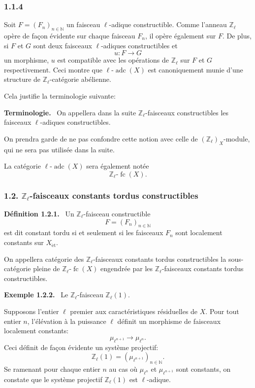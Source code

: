 \documentclass[11pt]{article}
\newenvironment{statement}[1]{\par\medskip\noindent\textbf{#1.}\ }{\par\medskip}
\providecommand{\fc}{\operatorname{fc}}
\providecommand{\adc}{\operatorname{adc}}
\begin{document}
\subsubsection*{1.1.4}
Soit \(F=(F_n)_{n\in\mathbb N}\) un faisceau \(\ell\)-adique constructible. Comme l'anneau \(\mathbb Z_\ell\) opère de façon évidente sur chaque faisceau \(F_n\), il opère également sur \(F\). De plus, si \(F\) et \(G\) sont deux faisceaux \(\ell\)-adiques constructibles et
\[
u:F\longrightarrow G
\]
un morphisme, \(u\) est compatible avec les opérations de \(\mathbb Z_\ell\) sur \(F\) et \(G\) respectivement. Ceci montre que \(\ell\text{-}\adc(X)\) est canoniquement munie d'une structure de \(\mathbb Z_\ell\)-catégorie abélienne.

Cela justifie la terminologie suivante:

\begin{statement}{Terminologie}
On appellera dans la suite \(\mathbb Z_\ell\)-faisceaux constructibles les faisceaux \(\ell\)-adiques constructibles.
\end{statement}

On prendra garde de ne pas confondre cette notion avec celle de \((\mathbb Z_\ell)_X\)-module, qui ne sera pas utilisée dans la suite.

La catégorie \(\ell\text{-}\adc(X)\) sera également notée
\[
\mathbb Z_\ell\text{-}\fc(X).
\]

\subsubsection*{1.2. \(\mathbb Z_\ell\)-faisceaux constants tordus constructibles}

\begin{statement}{Définition 1.2.1}
Un \(\mathbb Z_\ell\)-faisceau constructible
\[
F=(F_n)_{n\in\mathbb N}
\]
est dit constant tordu si et seulement si les faisceaux \(F_n\) sont localement constants sur \(X_{\mathrm{\acute et}}\).
\end{statement}

On appellera catégorie des \(\mathbb Z_\ell\)-faisceaux constants tordus constructibles la sous-catégorie pleine de \(\mathbb Z_\ell\text{-}\fc(X)\) engendrée par les \(\mathbb Z_\ell\)-faisceaux constants tordus constructibles.

\begin{statement}{Exemple 1.2.2}
Le \(\mathbb Z_\ell\)-faisceau \(\mathbb Z_\ell(1)\).
\end{statement}

Supposons l'entier \(\ell\) premier aux caractéristiques résiduelles de \(X\). Pour tout entier \(n\), l'élévation à la puissance \(\ell\) définit un morphisme de faisceaux localement constants:
\[
\mu_{\ell^{n+1}}\longrightarrow \mu_{\ell^n}.
\]
Ceci définit de façon évidente un système projectif:
\[
\mathbb Z_\ell(1)=(\mu_{\ell^{n+1}})_{n\in\mathbb N}.
\]
Se ramenant pour chaque entier \(n\) au cas où \(\mu_{\ell^n}\) et \(\mu_{\ell^{n+1}}\) sont constants, on constate que le système projectif \(\mathbb Z_\ell(1)\) est \(\ell\)-adique.
\end{document}
